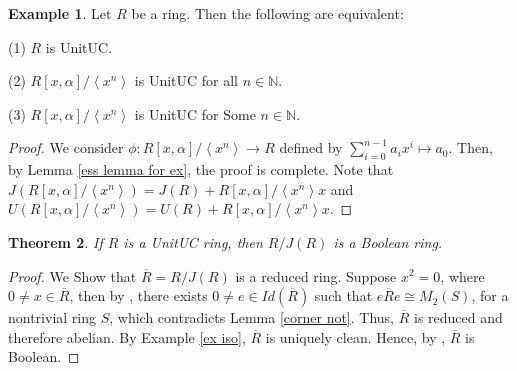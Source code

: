 \documentclass[12pt]{amsart}
\newtheorem{theorem}{Theorem}[section]
\theoremstyle{definition}
\newtheorem{example}[theorem]{Example}
\begin{document}
\begin{example}
Let $R$ be a ring. Then the following are equivalent:

(1) $R$ is   UnitUC.

(2) $R[x, \alpha]/\left\langle x^n \right\rangle$ is   UnitUC for all $n \in \mathbb{N}$.

(3)  $R[x, \alpha]/\left\langle x^n \right\rangle$ is   UnitUC for Some $n \in \mathbb{N}$.
\end{example}

\begin{proof}
     We consider $ \phi: R[x, \alpha]/\left\langle x^n \right\rangle \longrightarrow R$ defined by $ \sum_{i=0}^{n-1} a_ix^i \mapsto a_0 $. Then, by Lemma \ref{ess lemma for ex}, the proof is complete. Note that $J(R[x, \alpha]/\left\langle x^n \right\rangle) = J(R) + R[x, \alpha]/\left\langle x^n \right\rangle x $ and $ U(R[x, \alpha]/\left\langle x^n \right\rangle) = U(R) + R[x, \alpha]/\left\langle x^n \right\rangle x $.
\end{proof}

\begin{theorem} \label{bool}
     If $R$ is a  UnitUC ring, then $R/J(R)$ is a Boolean ring. 
\end{theorem}

\begin{proof}  
We Show that $\overline{R}=R/J(R)$ is a reduced ring. Suppose $x^2=0$, where $0 \neq x \in \overline{R}$, then by \cite[ Theorem 2.1]{lev}, there exists $0\neq e \in Id(\overline{R})$ such that $e\overline{R}e \cong M_2(S)$, for a nontrivial ring $S$, which contradicts Lemma \ref{corner not}. Thus, $\overline{R}$ is reduced and therefore abelian. By Example \ref{ex iso}, $\overline{R}$ is uniquely clean. Hence, by \cite[Theorem 20]{NZ}, $\overline{R}$ is Boolean.
\end{proof}
\end{document}
